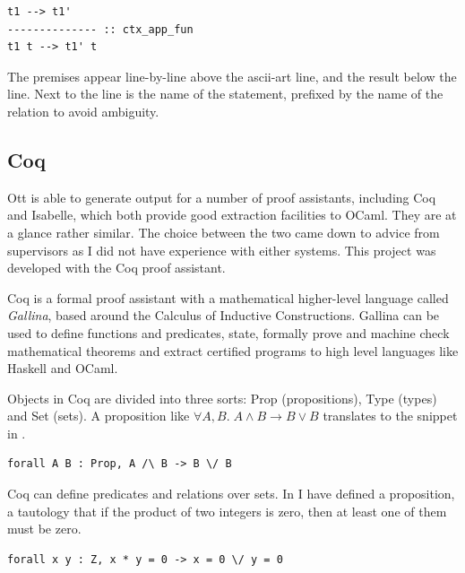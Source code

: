 \documentclass[12pt,twoside,notitlepage]{report}
\theoremstyle{plain}%
\theoremstyle{definition}
\theoremstyle{remark}
\begin{document}
\begin{lstlisting}[language={Ott}, caption={Ott single reduction}]
t1 --> t1'
-------------- :: ctx_app_fun
t1 t --> t1' t
\end{lstlisting}

The premises appear line-by-line above the ascii-art line, and the result below the line. Next to the line is the name of the statement, prefixed by the name of the relation to avoid ambiguity. 



\subsection{Coq}
Ott is able to generate output for a number of proof assistants, including Coq and Isabelle, which both provide good extraction facilities to OCaml. They are at a glance rather similar. The choice between the two came down to advice from supervisors as I did not have experience with either systems. This project was developed with the Coq proof assistant. 

Coq is a formal proof assistant with a mathematical higher-level language called \textit{Gallina}, based around the Calculus of Inductive Constructions. Gallina can be used to define functions and predicates, state, formally prove and machine check mathematical theorems and extract certified programs to high level languages like Haskell and OCaml.


Objects in Coq are divided into three sorts: Prop (propositions), Type (types) and Set (sets).  A proposition like $ \forall A, B.\; A \wedge B \rightarrow B \vee B $ translates to the snippet in .


\begin{lstlisting}[language={Coq},caption={Coq Prop logic example},label={lst:coqproplogex}]
forall A B : Prop, A /\ B -> B \/ B
\end{lstlisting}


Coq can define predicates and relations over sets. In  I have defined a proposition, a tautology that if the product of two integers is zero, then at least one of them must be zero.


\begin{lstlisting}[language={Coq},caption={Coq Prop predicate example},label={lst:coqpredex}]
forall x y : Z, x * y = 0 -> x = 0 \/ y = 0
\end{lstlisting}
\end{document}
